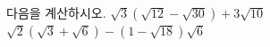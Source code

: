 다음을 계산하시오.
 $\sqrt{3}(\sqrt{12}-\sqrt{30})+3\sqrt{10}$
 $\sqrt{2}(\sqrt{3}+\sqrt{6})-(1-\sqrt{18})\sqrt{6}$
